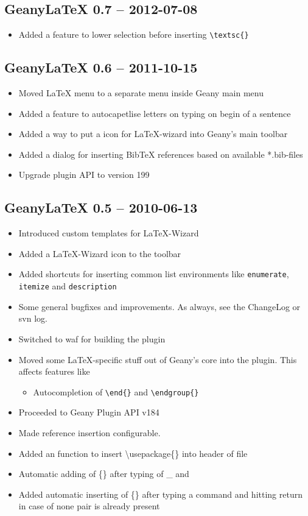 \documentclass[%
paper=a4,%
fontsize=11pt,%
twoside=false,%
DIV18,%
headsepline,%
plainheadsepline,%
footsepline,%
plainfootsepline,%
bibliography=totoc,%
listof=totoc,%
BCOR10mm,%
parskip=half,%
openany,%
]{scrartcl}
\begin{document}
\subsection{Geany\LaTeX{} 0.7 -- 2012-07-08}
\begin{itemize}
	\item Added a feature to lower selection before inserting
		\texttt{\textbackslash{}textsc\{\}}
\end{itemize}
\subsection{Geany\LaTeX{} 0.6 -- 2011-10-15}
\begin{itemize}
	\item Moved \LaTeX{} menu to a separate menu inside Geany main menu
	\item Added a feature to autocapetlise letters on typing on begin of
		  a sentence
	\item Added a way to put a icon for \LaTeX{}-wizard into Geany's main
		  toolbar
	\item Added a dialog for inserting BibTeX references based on
		  available *.bib-files
	\item Upgrade plugin API to version 199
\end{itemize}

\subsection{Geany\LaTeX{} 0.5 -- 2010-06-13}
\begin{itemize}

	\item Introduced custom templates for \LaTeX-Wizard
	\item Added a \LaTeX-Wizard icon to the toolbar
	\item Added shortcuts for inserting common list environments
		  like \texttt{enumerate}, \texttt{itemize} and
		  \texttt{description}
	\item Some general bugfixes and improvements. As always, see the
		  ChangeLog or svn log.
	\item Switched to waf for building the plugin
	\item Moved some \LaTeX{}-specific stuff out of Geany's core into the
		  plugin. This affects features like
			\begin{itemize}
				\item Autocompletion of \texttt{\textbackslash{}end\{\}}
					and \texttt{\textbackslash{}endgroup\{\}}
			\end{itemize}
	\item Proceeded to Geany Plugin API v184
	\item Made reference insertion configurable.
	\item Added an function to insert \textbackslash{}usepackage\{\} into
		  header of file
	\item Automatic adding of \{\} after typing of \_{} and 
	\item Added automatic inserting of \{\} after typing a command and
		  hitting return in case of none pair is already present

\end{itemize}
\end{document}
